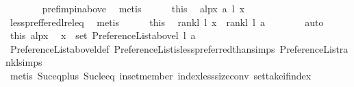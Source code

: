\begin{isabellebody}
\ \ \ \ \ \ \isamarkupfalse%
\ pref{\isacharunderscore}{\kern0pt}imp{\isacharunderscore}{\kern0pt}in{\isacharunderscore}{\kern0pt}above\ \isamarkupfalse%
\ {\isacharparenleft}{\kern0pt}metis{\isacharparenright}{\kern0pt}\isanewline
\ \ \ \ \isamarkupfalse%
\ this\ \isamarkupfalse%
\ alpx{\isacharcolon}{\kern0pt}\ {\isachardoublequoteopen}a\ {\isasymlesssim}\isactrlsub l\ x{\isachardoublequoteclose}\isanewline
\ \ \ \ \ \ \isamarkupfalse%
\ less{\isacharunderscore}{\kern0pt}preffered{\isacharunderscore}{\kern0pt}l{\isacharunderscore}{\kern0pt}rel{\isacharunderscore}{\kern0pt}eq\ \isamarkupfalse%
\ {\isacharparenleft}{\kern0pt}metis{\isacharparenright}{\kern0pt}\isanewline
\ \ \ \ \isamarkupfalse%
\ this\ \isamarkupfalse%
\ {\isachardoublequoteopen}rank{\isacharunderscore}{\kern0pt}l\ l\ x\ {\isasymle}\ rank{\isacharunderscore}{\kern0pt}l\ l\ a{\isachardoublequoteclose}\isanewline
\ \ \ \ \ \ \isamarkupfalse%
\ auto\isanewline
\ \ \ \ \isamarkupfalse%
\ this\ alpx\ \isamarkupfalse%
\ {\isachardoublequoteopen}x\ {\isasymin}\ set\ {\isacharparenleft}{\kern0pt}Preference{\isacharunderscore}{\kern0pt}List{\isachardot}{\kern0pt}above{\isacharunderscore}{\kern0pt}l\ l\ a{\isacharparenright}{\kern0pt}{\isachardoublequoteclose}\isanewline
\ \ \ \ \ \ \isamarkupfalse%
\ Preference{\isacharunderscore}{\kern0pt}List{\isachardot}{\kern0pt}above{\isacharunderscore}{\kern0pt}l{\isacharunderscore}{\kern0pt}def\ Preference{\isacharunderscore}{\kern0pt}List{\isachardot}{\kern0pt}is{\isacharunderscore}{\kern0pt}less{\isacharunderscore}{\kern0pt}preferred{\isacharunderscore}{\kern0pt}than{\isachardot}{\kern0pt}simps\ Preference{\isacharunderscore}{\kern0pt}List{\isachardot}{\kern0pt}rank{\isacharunderscore}{\kern0pt}l{\isachardot}{\kern0pt}simps\isanewline
\ \ \ \ \ \ \isamarkupfalse%
\ {\isacharparenleft}{\kern0pt}metis\ Suc{\isacharunderscore}{\kern0pt}eq{\isacharunderscore}{\kern0pt}plus{}\ Suc{\isacharunderscore}{\kern0pt}le{\isacharunderscore}{\kern0pt}eq\ in{\isacharunderscore}{\kern0pt}set{\isacharunderscore}{\kern0pt}member\ index{\isacharunderscore}{\kern0pt}less{\isacharunderscore}{\kern0pt}size{\isacharunderscore}{\kern0pt}conv\ set{\isacharunderscore}{\kern0pt}take{\isacharunderscore}{\kern0pt}if{\isacharunderscore}{\kern0pt}index{\isacharparenright}{\kern0pt}\isanewline
\ \ \isamarkupfalse%
\isanewline
{}\isamarkupfalse%

\end{isabellebody}
